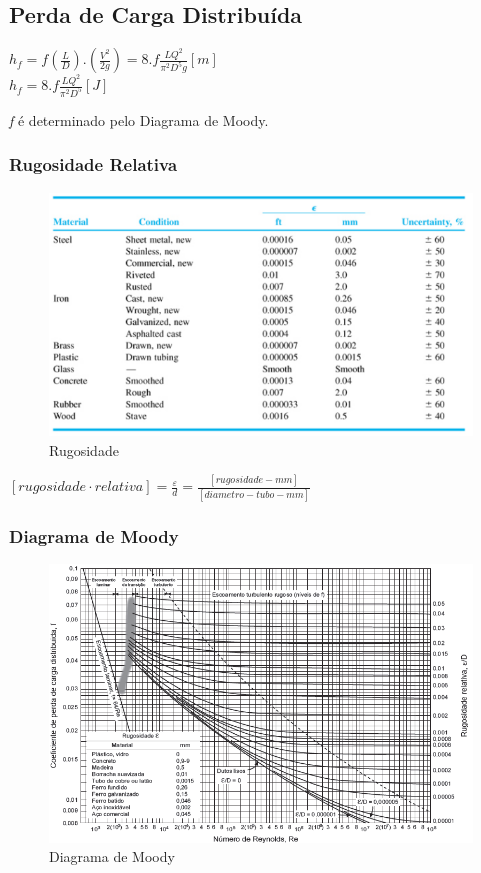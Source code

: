 \documentclass[a4paper, 12pt]{article}
\begin{document}
\newpage
\subsection{Perda de Carga Distribuída}
	\begin{center}
		\Large
		$
		h_{f} = f(\frac{L}{D}).(\frac{V^2}{2g}) = 8.f\frac{LQ^2}{\pi^2D^5g}[m]
		$\\$
		h_{f} = 8.f\frac{LQ^2}{\pi^2D^5}[J]
		$
	\end{center}
	\textit{f} é determinado pelo Diagrama de Moody.
\subsubsection{Rugosidade Relativa}
	\begin{figure}[h]
		\centering
		\includegraphics[width=0.7\linewidth]{imagens/rug}
		\caption{Rugosidade}
		\label{fig:rug}
	\end{figure}
	\begin{center}
		\Large
		$
		[rugosidade\cdot relativa] = \frac{\varepsilon}{d} = \frac{[rugosidade-mm]}{[diametro-tubo-mm]}
		$
	\end{center}
\subsubsection{Diagrama de Moody}
	\begin{figure}[h]
		\centering
		\includegraphics[width=0.9\linewidth]{imagens/moody}
		\caption{Diagrama de Moody}
		\label{fig:moody}
	\end{figure}
\end{document}
